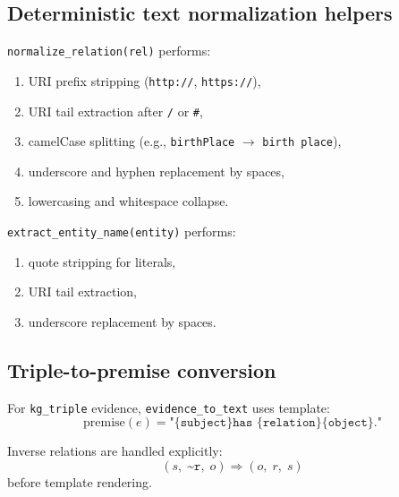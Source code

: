 \subsection{Deterministic text normalization helpers}
\texttt{normalize\_relation(rel)} performs:
\begin{enumerate}
\item URI prefix stripping (\texttt{http://}, \texttt{https://}),
\item URI tail extraction after \texttt{/} or \texttt{\#},
\item camelCase splitting (e.g., \texttt{birthPlace} $\rightarrow$ \texttt{birth place}),
\item underscore and hyphen replacement by spaces,
\item lowercasing and whitespace collapse.
\end{enumerate}

\texttt{extract\_entity\_name(entity)} performs:
\begin{enumerate}
\item quote stripping for literals,
\item URI tail extraction,
\item underscore replacement by spaces.
\end{enumerate}

\subsection{Triple-to-premise conversion}
For \texttt{kg\_triple} evidence, \texttt{evidence\_to\_text} uses template:
\begin{equation}
\text{premise}(e) = \texttt{"\{subject\} has \{relation\} \{object\}."}
\end{equation}

Inverse relations are handled explicitly:
\begin{equation}
(s,\;\texttt{\textasciitilde r},\;o) \Rightarrow (o,\;r,\;s)
\end{equation}
before template rendering.

